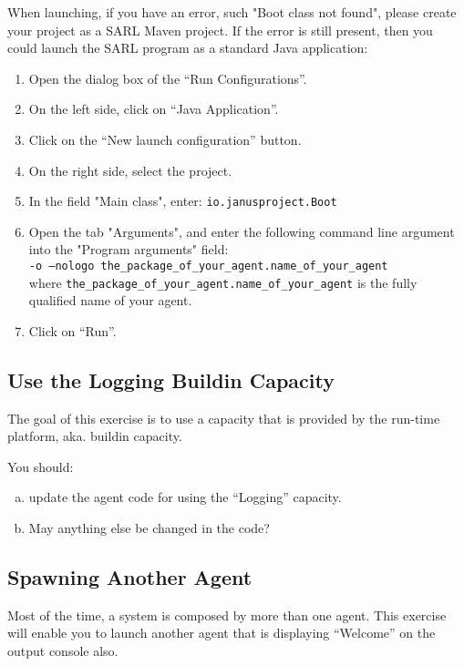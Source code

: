 \documentclass[article,english,nodocumentinfo]{utbmciadreport}
\begin{document}
When launching, if you have an error, such "Boot class not found", please create your project as a SARL Maven project.
If the error is still present, then you could launch the SARL program as a standard Java application:
\begin{enumerate}
\item Open the dialog box of the ``Run Configurations''.
\item On the left side, click on ``Java Application''.
\item Click on the ``New launch configuration'' button.
\item On the right side, select the project.
\item In the field "Main class", enter: \texttt{io.janusproject.Boot}
\item Open the tab "Arguments", and enter the following command line argument into the "Program arguments" field: \\
	\texttt{-o --nologo the\_package\_of\_your\_agent.name\_of\_your\_agent} \\
	where \texttt{the\_package\_of\_your\_agent.name\_of\_your\_agent} is the fully qualified name of your agent.
\item Click on ``Run''.
\end{enumerate}

\subsection{Use the Logging Buildin Capacity}

The goal of this exercise is to use a capacity that is provided by the run-time platform, aka. buildin capacity.

You should:
\begin{enumerate}[a)]
\item update the agent code for using the ``Logging'' capacity.
\item May anything else be changed in the code?
\end{enumerate}

\subsection{Spawning Another Agent}

Most of the time, a system is composed by more than one agent. This exercise will enable you to launch another agent that is displaying ``Welcome'' on the output console also.
\end{document}

